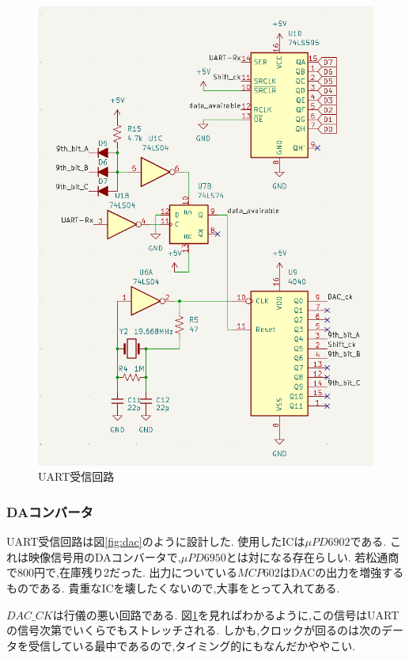 \documentclass[a4paper,10pt]{article}
\begin{document}
\begin{multicols}{2}
\begin{figure}[H]
    \centering
    \includegraphics[width=\linewidth]{figure/uart_rx.png} 
    \caption{UART受信回路} 
    \label{fig:uart_rx}
\end{figure}

\subsubsection{DAコンバータ}
UART受信回路は図\ref{fig:dac}のように設計した.
使用したICは$\mu PD6902$である.
これは映像信号用のDAコンバータで,$\mu PD6950$とは対になる存在らしい.
若松通商で800円で,在庫残り2だった.
出力についている$MCP602$はDACの出力を増強するものである.
貴重なICを壊したくないので,大事をとって入れてある.

$DAC\_CK$は行儀の悪い回路である.
図\ref{fig:uart_rx}を見ればわかるように,この信号はUARTの信号次第でいくらでもストレッチされる.
しかも,クロックが回るのは次のデータを受信している最中であるので,タイミング的にもなんだかややこい.


\end{multicols}
\end{document}
